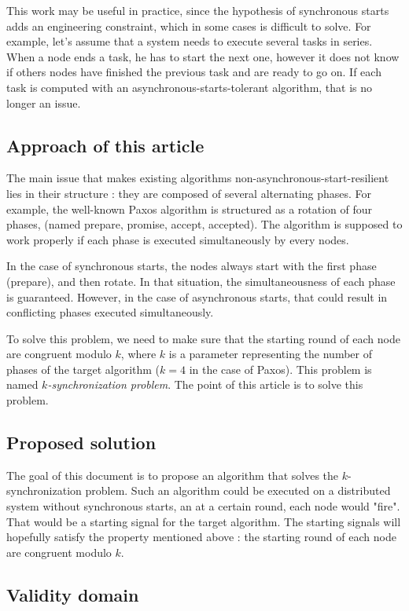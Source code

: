 \documentclass{article}
\begin{document}
This work may be useful in practice, since the hypothesis of synchronous starts adds an engineering constraint, which in some cases is difficult to solve.
For example, let's assume that a system needs to execute several tasks in series.
When a node ends a task, he has to start the next one, however it does not know if others nodes have finished the previous task and are ready to go on.
If each task is computed with an asynchronous-starts-tolerant algorithm, that is no longer an issue.

\subsection{Approach of this article}

The main issue that makes existing algorithms non-asynchronous-start-resilient lies in their structure :
they are composed of several alternating phases.
For example, the well-known Paxos algorithm is structured as a rotation of four phases, (named prepare,
promise, accept, accepted).
The algorithm is supposed to work properly if each phase is executed simultaneously by every nodes.

In the case of synchronous starts, the nodes always start with the first phase (prepare), and then rotate.
In that situation, the simultaneousness of each phase is guaranteed.
However, in the case of asynchronous starts, that could result in conflicting phases executed simultaneously.

To solve this problem, we need to make sure that the starting round of each node are congruent modulo $k$,
where $k$ is a parameter representing the number of phases of the target algorithm ($k=4$ in the case of Paxos).
This problem is named \emph{$k$-synchronization problem}.
The point of this article is to solve this problem.

\subsection{Proposed solution}

The goal of this document is to propose an algorithm that solves the $k$-synchronization problem.
Such an algorithm could be executed on a distributed system without synchronous starts,
an at a certain round, each node would "fire".
That would be a starting signal for the target algorithm.
The starting signals will hopefully satisfy the property mentioned above :
the starting round of each node are congruent modulo $k$.

\subsection{Validity domain}
\end{document}
